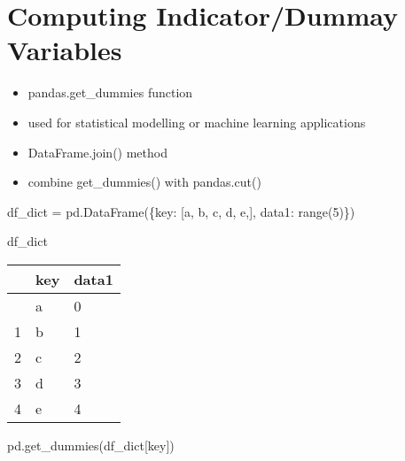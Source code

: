 \documentclass[
  letterpaper,
  DIV=11,
  numbers=noendperiod]{scrreprt}
\newenvironment{Shaded}{\begin{snugshade}}{\end{snugshade}}
\newcommand{\BuiltInTok}[1]{\textcolor[rgb]{0.00,0.23,0.31}{#1}}
\newcommand{\DecValTok}[1]{\textcolor[rgb]{0.68,0.00,0.00}{#1}}
\newcommand{\NormalTok}[1]{\textcolor[rgb]{0.00,0.23,0.31}{#1}}
\newcommand{\OperatorTok}[1]{\textcolor[rgb]{0.37,0.37,0.37}{#1}}
\newcommand{\StringTok}[1]{\textcolor[rgb]{0.13,0.47,0.30}{#1}}
\providecommand{\tightlist}{%
  \setlength{\itemsep}{0pt}\setlength{\parskip}{0pt}}\usepackage{longtable,booktabs,array}
\begin{document}
\hypertarget{computing-indicatordummay-variables}{%
\section{Computing Indicator/Dummay
Variables}\label{computing-indicatordummay-variables}}

\begin{itemize}
\tightlist
\item
  pandas.get\_dummies function
\item
  used for statistical modelling or machine learning applications
\item
  DataFrame.join() method
\item
  combine get\_dummies() with pandas.cut()
\end{itemize}

\begin{Shaded}
\begin{Highlighting}[]
\NormalTok{df\_dict }\OperatorTok{=}\NormalTok{ pd.DataFrame(\{}\StringTok{\textquotesingle{}key\textquotesingle{}}\NormalTok{: [}\StringTok{\textquotesingle{}a\textquotesingle{}}\NormalTok{, }\StringTok{\textquotesingle{}b\textquotesingle{}}\NormalTok{, }\StringTok{\textquotesingle{}c\textquotesingle{}}\NormalTok{, }\StringTok{\textquotesingle{}d\textquotesingle{}}\NormalTok{, }\StringTok{\textquotesingle{}e\textquotesingle{}}\NormalTok{,],}
                       \StringTok{\textquotesingle{}data1\textquotesingle{}}\NormalTok{: }\BuiltInTok{range}\NormalTok{(}\DecValTok{5}\NormalTok{)\})}

\NormalTok{df\_dict}
\end{Highlighting}
\end{Shaded}

\begin{longtable}[]{@{}lll@{}}
\toprule\noalign{}
& key & data1 \\
\midrule\noalign{}
\endhead
\bottomrule\noalign{}
\endlastfoot
0 & a & 0 \\
1 & b & 1 \\
2 & c & 2 \\
3 & d & 3 \\
4 & e & 4 \\
\end{longtable}

\begin{Shaded}
\begin{Highlighting}[]
\NormalTok{pd.get\_dummies(df\_dict[}\StringTok{\textquotesingle{}key\textquotesingle{}}\NormalTok{])}
\end{Highlighting}
\end{Shaded}
\end{document}
